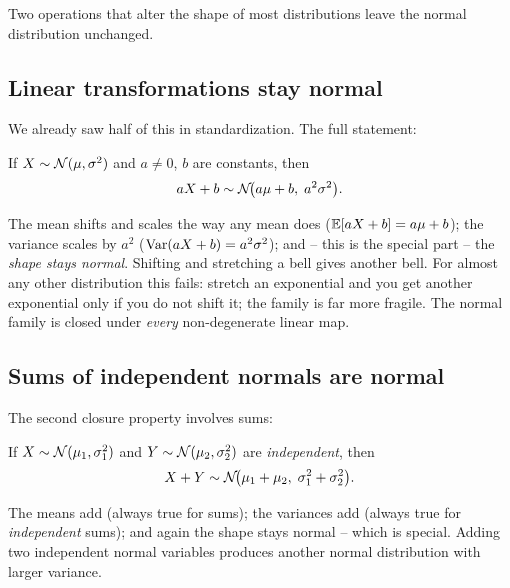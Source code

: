 Two operations that alter the shape of most distributions leave the normal distribution unchanged.

\subsection{Linear transformations stay normal}
\label{ch12:linear}

We already saw half of this in standardization. The full statement:

\begin{theorem}
\label{ch12:thm-linear}
If $X \sim \mathcal{N}(\mu, \sigma^2)$ and $a \ne 0$, $b$ are constants, then
\[
  aX + b \sim \mathcal{N}\!\big(a\mu + b,\; a^2\sigma^2\big).
\]
\end{theorem}

The mean shifts and scales the way any mean does ($\operatorname{\mathbb{E}}[aX+b] = a\mu + b$); the
variance scales by $a^2$ ($\operatorname{Var}(aX+b) = a^2\sigma^2$); and -- this is the special
part -- the \emph{shape stays normal}. Shifting and stretching a bell gives another
bell. For almost any other distribution this fails: stretch an exponential and you
get another exponential only if you do not shift it; the family is far more
fragile. The normal family is closed under \emph{every} non-degenerate linear map.

\subsection{Sums of independent normals are normal}
\label{ch12:sums}

The second closure property involves sums:

\begin{theorem}
\label{ch12:thm-sum}
If $X \sim \mathcal{N}(\mu_1, \sigma_1^2)$ and $Y \sim \mathcal{N}(\mu_2, \sigma_2^2)$ are
\emph{independent}, then
\[
  X + Y \sim \mathcal{N}\!\big(\mu_1 + \mu_2,\; \sigma_1^2 + \sigma_2^2\big).
\]
\end{theorem}

The means add (always true for sums); the variances add (always true for
\emph{independent} sums); and again the shape stays normal -- which is special. Adding
two independent normal variables produces another normal distribution with larger
variance.

